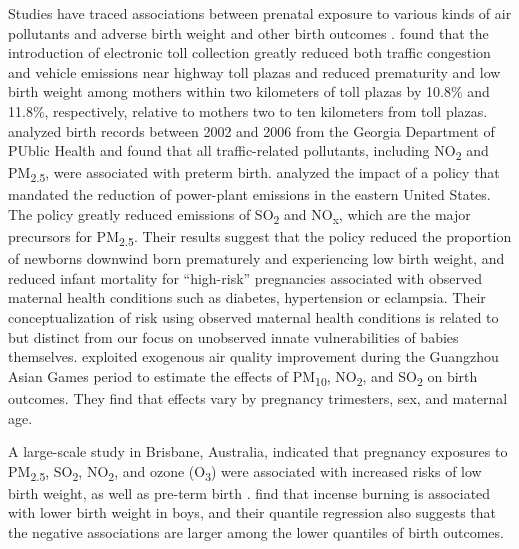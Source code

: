 Studies have traced associations between prenatal exposure to various
kinds of air pollutants and adverse birth weight and other birth
outcomes \autocite{shah_air_2011, stieb_ambient_2012, klepac_ambient_2018, melody_maternal_2019}. 
\textcite{currie_traffic_2011} found that the introduction of electronic toll collection greatly reduced both traffic congestion and vehicle emissions
near highway toll plazas and reduced prematurity and low birth weight among mothers within two
kilometers of toll plazas by 10.8\% and 11.8\%,
respectively, relative to mothers two to ten kilometers from  toll plazas. \textcite{hao_air_2016} analyzed birth records between 2002 and 2006 from the
Georgia Department of PUblic Health and found that all traffic-related
pollutants, including NO\textsubscript{2} and PM\textsubscript{2.5}, were associated with preterm birth. 
\textcite{decicca_when_2020} analyzed the impact of a policy that mandated the reduction of power-plant emissions in the eastern United States. The policy greatly reduced emissions of SO\textsubscript{2} and NO\textsubscript{x}, which are the major precursors for PM\textsubscript{2.5}. Their results suggest that the policy reduced the proportion of newborns downwind born prematurely and experiencing low birth weight, and reduced infant mortality for “high-risk” pregnancies associated with observed maternal health conditions such as diabetes, hypertension or eclampsia. Their conceptualization of risk using observed maternal health conditions is related to but distinct from our focus on unobserved innate vulnerabilities of babies themselves.  \textcite{LIU2022101078} exploited exogenous air quality improvement during the Guangzhou Asian Games period to estimate the effects of PM\textsubscript{10}, NO\textsubscript{2}, and SO\textsubscript{2} on birth outcomes. They find that effects vary by pregnancy trimesters, sex, and maternal age.

A large-scale study in Brisbane, Australia, indicated that pregnancy exposures to PM\textsubscript{2.5}, SO\textsubscript{2}, NO\textsubscript{2}, and ozone (O\textsubscript{3}) were associated with increased
risks of low birth weight, as well as pre-term birth \autocite{chen_exposure_2018}. \textcite{chen_incense_2016} find that incense burning is associated with lower birth weight in boys, and their quantile regression also suggests that the negative associations are larger among the lower quantiles of birth outcomes.

